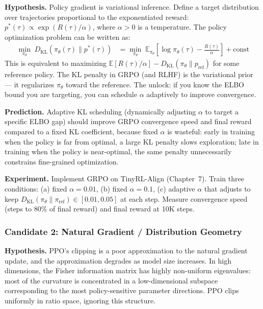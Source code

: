 \textbf{Hypothesis.} Policy gradient is variational inference. Define a target distribution over trajectories proportional to the exponentiated reward: $p^*(\tau) \propto \exp(R(\tau) / \alpha)$, where $\alpha > 0$ is a temperature. The policy optimization problem can be written as:
\begin{align*}
  \min_{\pi_\theta} \; D_{\mathrm{KL}}(\pi_\theta(\tau) \| p^*(\tau)) &= \min_{\pi_\theta} \; \mathbb{E}_{\pi_\theta}\!\left[\log \pi_\theta(\tau) - \frac{R(\tau)}{\alpha}\right] + \text{const}
\end{align*}
This is equivalent to maximizing $\mathbb{E}[R(\tau)/\alpha] - D_{\mathrm{KL}}(\pi_\theta \| p_{\text{ref}})$ for some reference policy. The KL penalty in GRPO (and RLHF) is the variational prior --- it regularizes $\pi_\theta$ toward the reference. The unlock: if you know the ELBO bound you are targeting, you can schedule $\alpha$ adaptively to improve convergence.

\textbf{Prediction.} Adaptive KL scheduling (dynamically adjusting $\alpha$ to target a specific ELBO gap) should improve GRPO convergence speed and final reward compared to a fixed KL coefficient, because fixed $\alpha$ is wasteful: early in training when the policy is far from optimal, a large KL penalty slows exploration; late in training when the policy is near-optimal, the same penalty unnecessarily constrains fine-grained optimization.

\textbf{Experiment.} Implement GRPO on TinyRL-Align (Chapter~7). Train three conditions: (a) fixed $\alpha = 0.01$, (b) fixed $\alpha = 0.1$, (c) adaptive $\alpha$ that adjusts to keep $D_{\mathrm{KL}}(\pi_\theta \| \pi_{\text{ref}}) \in [0.01, 0.05]$ at each step. Measure convergence speed (steps to 80\% of final reward) and final reward at 10K steps.

\subsubsection{Candidate 2: Natural Gradient / Distribution Geometry}

\textbf{Hypothesis.} PPO's clipping is a poor approximation to the natural gradient update, and the approximation degrades as model size increases. In high dimensions, the Fisher information matrix has highly non-uniform eigenvalues: most of the curvature is concentrated in a low-dimensional subspace corresponding to the most policy-sensitive parameter directions. PPO clips uniformly in ratio space, ignoring this structure.

